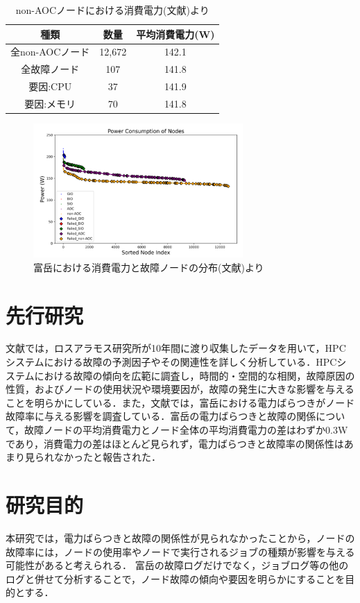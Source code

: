 \documentclass[a4paper,11pt,twocolumn]{jsarticle}
\begin{document}
\begin{table}[t]
  \centering
  \caption{non-AOCノードにおける消費電力(文献\cite{master_kusaba})より}
  \label{tab:power}
  \begin{tabular}{c|cc}
    \hline
    種類 & 数量 & 平均消費電力(W) \\
    \hline 
    \hline
    全non-AOCノード & 12,672 & 142.1  \\
    全故障ノード & 107 & 141.8  \\
    \hline
    要因:CPU & 37 & 141.9 \\
    要因:メモリ & 70 & 141.8 \\
    \hline
  \end{tabular}
\end{table}

\begin{figure}[t]
  \centering
  \includegraphics[width=8cm]{figure/Fugakufail.pdf}
  \caption{富岳における消費電力と故障ノードの分布(文献\cite{master_kusaba})より}
  \label{fig:Fugakufail}
\end{figure}

\section{先行研究}
文献\cite{HPC_system_fail}では，ロスアラモス研究所が10年間に渡り収集したデータを用いて，HPCシステムにおける故障の予測因子やその関連性を詳しく分析している．HPCシステムにおける故障の傾向を広範に調査し，時間的・空間的な相関，故障原因の性質，およびノードの使用状況や環境要因が，故障の発生に大きな影響を与えることを明らかにしている．また，文献\cite{master_kusaba}では，富岳における電力ばらつきがノード故障率に与える影響を調査している．富岳の電力ばらつきと故障の関係について，故障ノードの平均消費電力とノード全体の平均消費電力の差はわずか0.3Wであり，消費電力の差はほとんど見られず，電力ばらつきと故障率の関係性はあまり見られなかったと報告された．

\section{研究目的}
本研究では，電力ばらつきと故障の関係性が見られなかったことから，ノードの故障率には，ノードの使用率やノードで実行されるジョブの種類が影響を与える可能性があると考えられる．
富岳の故障ログだけでなく，ジョブログ等の他のログと併せて分析することで，ノード故障の傾向や要因を明らかにすることを目的とする．
\end{document}
